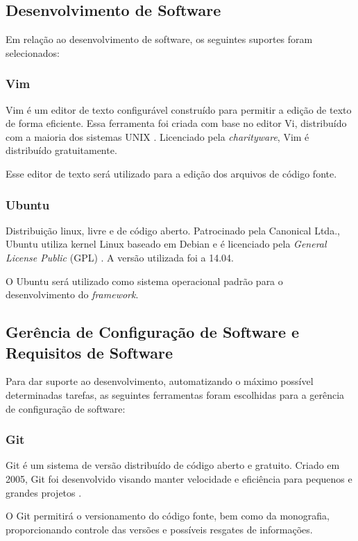 \begin{apendicesenv}
\subsection{Desenvolvimento de Software}
Em relação ao desenvolvimento de software, os seguintes suportes foram selecionados:

\subsubsection{Vim}
Vim é um editor de texto configurável construído para permitir a edição de texto de forma eficiente. Essa ferramenta foi criada com base no editor Vi, distribuído com a maioria dos sistemas UNIX \cite{vim}. Licenciado pela \textit{charityware}, Vim é distribuído gratuitamente. 
\par
\indent Esse editor de texto será utilizado para a edição dos arquivos de código fonte.

\subsubsection{Ubuntu}
Distribuição linux, livre e de código aberto. Patrocinado pela Canonical Ltda., Ubuntu utiliza kernel Linux baseado em Debian e é licenciado pela \textit{General License Public} (GPL) \cite{ubuntu2010}. A versão utilizada foi a 14.04.
\par
\indent O Ubuntu será utilizado como sistema operacional padrão para o desenvolvimento do \textit{framework}.

\subsection{Gerência de Configuração de Software e Requisitos de Software}
Para dar suporte ao desenvolvimento, automatizando o máximo possível determinadas tarefas, as seguintes ferramentas foram escolhidas para a gerência de configuração de software:

\subsubsection{Git}
Git é um sistema de versão distribuído de código aberto e gratuito. Criado em 2005, Git foi desenvolvido visando manter velocidade e eficiência para pequenos e grandes projetos \cite{git2015}. 
\par
\indent O Git permitirá o versionamento do código fonte, bem como da monografia, proporcionando controle das versões e possíveis resgates de informações.


\end{apendicesenv}
